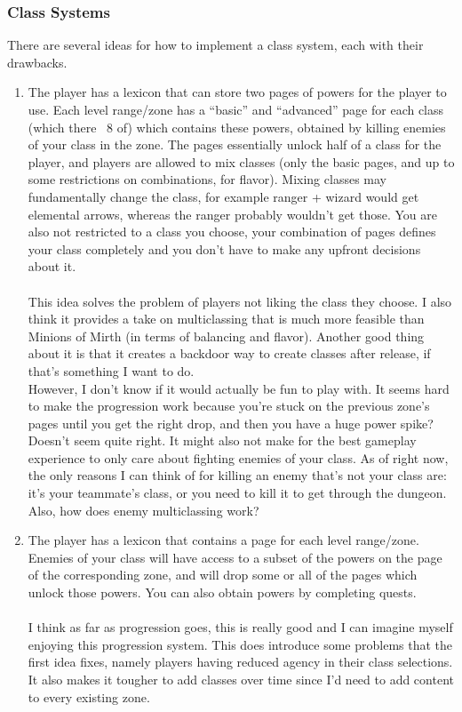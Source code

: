 \documentclass{article}
\begin{document}
\subsubsection{Class Systems}
There are several ideas for how to implement a class system, each with their drawbacks.
\begin{enumerate}
    \item The player has a lexicon that can store two pages of powers for the player to use.
        Each level range/zone has a ``basic'' and ``advanced'' page for each class (which there
        ~8 of) which contains these powers,
        obtained by killing enemies of your class in the zone. The pages essentially unlock half of a class
        for the player, and players are allowed to mix classes (only the basic pages, and up to some
        restrictions on combinations, for flavor). Mixing classes may fundamentally change the
        class, for example ranger + wizard would get elemental arrows, whereas the ranger probably wouldn't
        get those. You are also not restricted to a class you choose, your combination of pages defines
        your class completely and you don't have to make any upfront decisions about it.\\\ \\
        This idea solves the problem of players not liking the class they choose. I also think it
        provides a take on multiclassing that is much more feasible than Minions of Mirth (in terms
        of balancing and flavor). Another good thing about it is that it creates a backdoor way to
        create classes after release, if that's something I want to do.\\
        However, I don't know if it would actually be fun to play with. It
        seems hard to make the progression work because you're stuck on the previous zone's pages
        until you get the right drop, and then you have a huge power spike? Doesn't seem quite right.
        It might also not make for the best gameplay experience to only care about fighting enemies
        of your class. As of right now, the only reasons I can think of for killing an enemy that's not
        your class are: it's your teammate's class, or you need to kill it to get through the dungeon. Also,
        how does enemy multiclassing work?
    \item The player has a lexicon that contains a page for each level range/zone. Enemies of your class
        will have access to a subset of the powers on the page of the corresponding zone, and will drop some
        or all of the pages which unlock those powers. You can also obtain powers by completing quests.\\\ \\
        I think as far as progression goes, this is really good and I can imagine myself enjoying this
        progression system. This does introduce some problems that the first idea fixes, namely players
        having reduced agency in their class selections. It also makes it tougher to add classes over
        time since I'd need to add content to every existing zone.
\end{enumerate}
\end{document}
